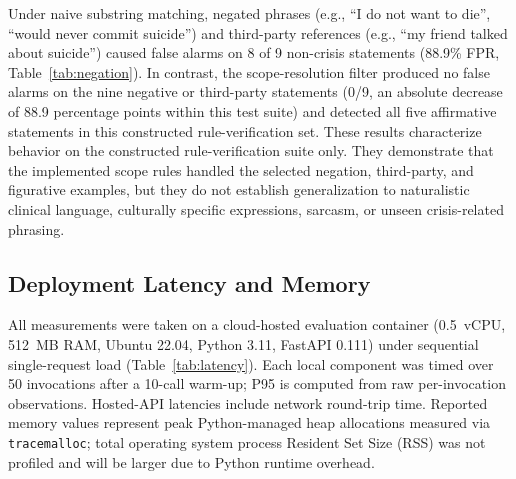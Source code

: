 \documentclass[10pt, conference, letterpaper]{IEEEtran}
\begin{document}
Under naive substring matching, negated phrases (e.g., ``I do not want to die'',
``would never commit suicide'') and third-party references (e.g., ``my friend
talked about suicide'') caused false alarms on 8 of 9 non-crisis statements
(88.9\% FPR, Table~\ref{tab:negation}).
In contrast, the scope-resolution filter produced no false alarms on the nine
negative or third-party statements (0/9, an absolute decrease of 88.9 percentage
points within this test suite) and detected all five affirmative statements in
this constructed rule-verification set.
These results characterize behavior on the constructed rule-verification suite only.
They demonstrate that the implemented scope rules handled the selected negation,
third-party, and figurative examples, but they do not establish generalization
to naturalistic clinical language, culturally specific expressions, sarcasm, or
unseen crisis-related phrasing.

\begin{table}[!t]
\caption{Crisis Intent Disambiguation: Naive vs.\ Scope-Resolved}
\label{tab:negation}
\centering
{}
\end{table}

\subsection{Deployment Latency and Memory}
\label{sec:latency}

All measurements were taken on a cloud-hosted evaluation container
(0.5~vCPU, 512~MB RAM, Ubuntu 22.04, Python 3.11, FastAPI 0.111) under
sequential single-request load (Table~\ref{tab:latency}).
Each local component was timed over 50 invocations after a 10-call warm-up;
P95 is computed from raw per-invocation observations.
Hosted-API latencies include network round-trip time.
Reported memory values represent peak Python-managed heap allocations measured
via \texttt{tracemalloc}; total operating system process Resident Set Size (RSS)
was not profiled and will be larger due to Python runtime overhead.
\end{document}
